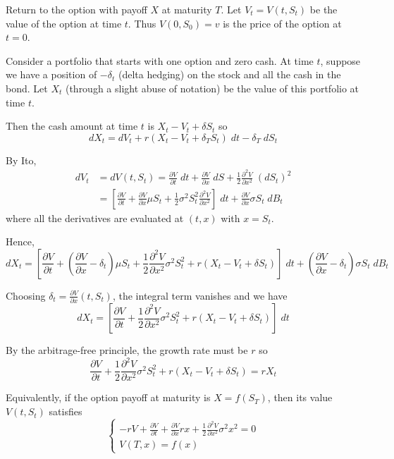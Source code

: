 \documentclass[12pt]{report}
\begin{document}
Return to the option with payoff $X$ at maturity $T$. Let $V_t = V(t, S_t)$ be the value of the option at time $t$. Thus $V(0, S_0) = v$ is the price of the option at $t = 0$. 

Consider a portfolio that starts with one option and zero cash. At time $t$, suppose we have a position of $-\delta_t$ (delta hedging) on the stock and all the cash in the bond. Let $X_t$ (through a slight abuse of notation) be the value of this portfolio at time $t$. 

Then the cash amount at time $t$ is $X_t - V_t + \delta S_t$ so 
\[dX_t = dV_t + r(X_t - V_t + \delta_T S_t)\; dt - \delta_T \; dS_t\]

By Ito, 
\begin{align*}
    dV_t &= dV(t, S_t) = \frac{\partial V}{\partial t} \; dt + \frac{\partial V}{\partial x} \; dS + \frac{1}{2} \frac{\partial^2 V}{\partial x^2} \; (dS_t)^2\\
    &= \left[\frac{\partial V}{\partial t} + \frac{\partial V}{\partial x} \mu S_t + \frac{1}{2} \sigma^2 S_t^2 \frac{\partial^2 V}{\partial x^2}\right]\; dt + \frac{\partial V}{\partial x} \sigma S_t \; dB_t
\end{align*}
where all the derivatives are evaluated at $(t, x)$ with $x = S_t$.

Hence, 
\[dX_t = \left[\frac{\partial V}{\partial t} +\left(\frac{\partial V}{\partial x} - \delta_t\right)\mu S_t + \frac{1}{2} \frac{\partial^2 V}{\partial x^2}\sigma^2 S_t^2  + r(X_t - V_t + \delta S_t)\right]\; dt + \left(\frac{\partial V}{\partial x} - \delta_t\right)\sigma S_t \; dB_t\]

Choosing $\delta_t = \frac{\partial V}{\partial x}(t, S_t)$, the integral term vanishes and we have
\[dX_t = \left[\frac{\partial V}{\partial t} + \frac{1}{2} \frac{\partial^2 V}{\partial x^2}\sigma^2 S_t^2  + r(X_t - V_t + \delta S_t)\right]\; dt\]

By the arbitrage-free principle, the growth rate must be $r$ so 
\[\frac{\partial V}{\partial t} + \frac{1}{2} \frac{\partial^2 V}{\partial x^2}\sigma^2 S_t^2  + r(X_t - V_t + \delta S_t) = rX_t\]

Equivalently, if the option payoff at maturity is $X = f(S_T)$, then its value $V(t, S_t)$ satisfies 
\[\begin{cases}
    -rV + \frac{\partial V}{\partial t} + \frac{\partial V}{\partial x} rx + \frac{1}{2}\frac{\partial^2 V}{\partial x^2} \sigma^2 x^2 = 0\\ 
    V(T, x) = f(x)
\end{cases}\]
\end{document}
